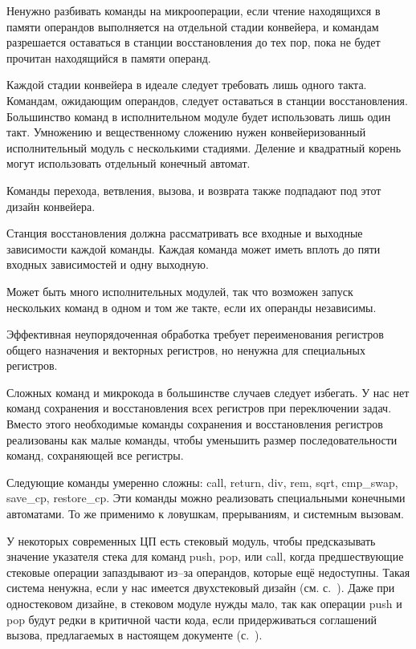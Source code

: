 \documentclass[forwardcom.tex]{subfiles}
\begin{document}
Ненужно разбивать команды на микрооперации, если чтение находящихся в памяти операндов выполняется на отдельной стадии конвейера, и командам разрешается оставаться в станции восстановления до тех пор, пока не будет прочитан находящийся в памяти операнд.

Каждой стадии конвейера в идеале следует требовать лишь одного такта. Командам, ожидающим операндов, следует оставаться в станции восстановления. Большинство команд в исполнительном модуле будет использовать лишь один такт. Умножению и вещественному сложению нужен конвейеризованный исполнительный модуль с несколькими стадиями. Деление и квадратный корень могут использовать отдельный конечный автомат.

Команды перехода, ветвления, вызова, и возврата также подпадают под этот дизайн конвейера.

Станция восстановления должна рассматривать все входные и выходные зависимости каждой команды. Каждая команда может иметь вплоть до пяти входных зависимостей и одну выходную. 

Может быть много исполнительных модулей, так что возможен запуск нескольких команд в одном и том же такте, если их операнды независимы.

Эффективная неупорядоченная обработка требует переименования регистров общего назначения и векторных регистров, но ненужна для специальных регистров. 

Сложных команд и микрокода в большинстве случаев следует избегать. У нас нет команд сохранения и восстановления всех регистров при переключении задач. Вместо этого необходимые команды сохранения и восстановления регистров реализованы как малые команды, чтобы уменьшить размер последовательности команд, сохраняющей все регистры.

Следующие команды умеренно сложны: call, return, div, rem, sqrt, cmp\_swap, save\_cp, restore\_cp. Эти команды можно реализовать специальными конечными автоматами. То же применимо к ловушкам, прерываниям, и системным вызовам.

У некоторых современных ЦП есть \glqq стековый модуль\grqq, чтобы предсказывать значение указателя стека для команд push, pop, или call, когда предшествующие стековые операции запаздывают из--за операндов, которые ещё недоступны. Такая система ненужна, если у нас имеется двухстековый дизайн (см. с.~\pageref{dualStack}). Даже при одностековом дизайне, в стековом модуле нужды мало, так как операции  push и pop будут редки в критичной части кода, если придерживаться соглашений вызова, предлагаемых в настоящем документе (с.~\pageref{functionCallingConventions}). 
\end{document}

